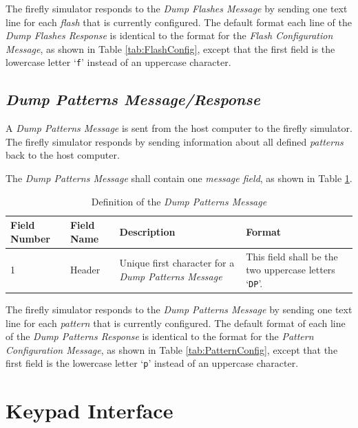 \documentclass[letterpaper,11pt]{article}
\begin{document}
The firefly simulator responds to the \textit{Dump Flashes Message} by
sending one text line for each \textit{flash} that is currently configured.
The default format each line of the \textit{Dump Flashes Response} is identical
to the format for the \textit{Flash Configuration Message}, as shown in
Table \ref{tab:FlashConfig}, except that the first field is the lowercase
letter `\texttt{f}' instead of an uppercase character.

\subsection{\textit{Dump Patterns Message/Response}}

A \textit{Dump Patterns Message} is sent from the host computer to the
firefly simulator. The firefly simulator responds by sending information
about all defined \textit{patterns} back to the host computer.

The \textit{Dump Patterns Message} shall contain one \textit{message field},
as shown in Table \ref{tab:DumpPatterns}.

\begin{table}[H]
  \caption{Definition of the \textit{Dump Patterns Message}}
  \centering
  \setlength\extrarowheight{2pt}
  \begin{tabular}[h]{|p{0.5in}|p{1.00in}|p{2.25in}|p{2.25in}|} \hline
    Field Number & Field Name & Description & Format \\ \hline
    1            & Header
    & Unique first character for a \textit{Dump Patterns Message}
    & This field shall be the two uppercase letters `\texttt{DP}'.
    \\ \hline
  \end{tabular}
  \label{tab:DumpPatterns}
\end{table}

The firefly simulator responds to the \textit{Dump Patterns Message} by
sending one text line for each \textit{pattern} that is currently configured.
The default format of each line of the \textit{Dump Patterns Response} is
identical to the format for the \textit{Pattern Configuration Message}, as
shown in Table \ref{tab:PatternConfig}, except that the first field is the
lowercase letter `\texttt{p}' instead of an uppercase character.

\section{Keypad Interface}
\end{document}
